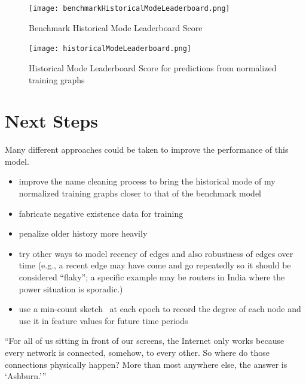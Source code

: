 \documentclass{article} %
\begin{document}
\begin{figure}
  \begin{center}
    \texttt{[image: benchmarkHistoricalModeLeaderboard.png]}
  \end{center}
  \caption{Benchmark Historical Mode Leaderboard Score}
  \label{fig:bm}
\end{figure}

\begin{figure}
  \begin{center}
    \texttt{[image: historicalModeLeaderboard.png]}
  \end{center}
  \caption{Historical Mode Leaderboard Score for predictions from normalized
    training graphs}
  \label{fig:hm}
\end{figure}

\pagebreak
\section{Next Steps}

Many different approaches could be taken to improve the performance of this model.

\begin{itemize}
\item improve the name cleaning process to bring the historical mode of my
  normalized training graphs closer to that of the benchmark model
\item fabricate negative existence data for training
\item penalize older history more heavily
\item try other ways to model recency of edges and also robustness
  of edges over time  (e.g., a recent edge may have come and go repeatedly so it
  should be considered ``flaky''; a specific example may be routers in India
  where the power situation is sporadic.)
\item use a min-count sketch~\cite{min} at each epoch to record the degree of each
node and use it in feature values for future time periods 
\end{itemize}

``For all of us sitting in front of our screens, the Internet only works
because every network is connected, somehow, to every other. So where do
those connections physically happen? More than most anywhere else, the
answer is `Ashburn.'''~\cite{tube}  
\end{document}
